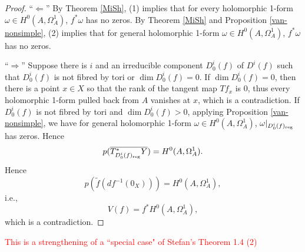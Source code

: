 \documentclass[a4paper,12pt,reqno]{amsart}
\theoremstyle{plain}
\newtheorem{lemma}[theorem]{Lemma}
\theoremstyle{remark}
\newcommand{\sorry}[1]{\textcolor{red}{#1}}
\begin{document}
\begin{proof} ``$\Leftarrow$'' By Theorem \ref{MiSh}, (1) implies that for every holomorphic 1-form $\omega\in H^0(A, \Omega_A^1)$, $f^*\omega$ has no zeros. By Theorem \ref{MiSh} and Proposition \ref{van-nonsimple}, (2) implies that for general holomorphic 1-form $\omega\in H^0(A, \Omega_A^1)$, $f^*\omega$ has no zeros.


``$\Rightarrow$'' 
Suppose there is $i$ and an irreducible component $D_0^i(f)$ of $D^i(f)$ such that $D_0^i(f)$ is not fibred by tori or $\dim D_0^i(f)=0$. If $\dim D^i_0(f)=0$, then there is a point $x\in X$ so that the rank of the tangent map $Tf_x$ is 0, thus every holomorphic 1-form pulled back from $A$ vanishes at $x$, which is a contradiction. If $D_0^i(f)$ is not fibred by tori and $\dim D_0^i(f)>0$, applying Proposition \ref{van-nonsimple}, we have for general holomorphic 1-form $\omega\in H^0(A, \Omega_A^1)$, $\omega|_{D_0^i(f)_{\textnormal{reg}}}$ has zeros. Hence $$p(\overline{T^*_{D_0^i(f)_{\textnormal{reg}}}Y})=H^0(A, \Omega_A^1).$$ Hence $$p(\tilde{f}(df^{-1}(0_X)))=H^0(A, \Omega_A^1),$$ i.e.,$$V(f)=f^*H^0(A, \Omega_A^1),$$ which is a contradiction.
\end{proof}

\sorry{This is a strengthening of a ``special case" of Stefan's Theorem 1.4 (2)}





\end{document}
